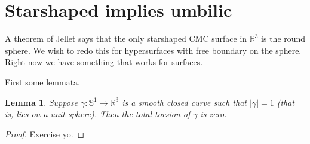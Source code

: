 \documentclass[10pt]{amsart}
\newcommand{\R}{\ensuremath{\mathbb{R}}}
\renewcommand{\S}{\ensuremath{\mathbb{S}}}
\newtheorem{lem}[thm]{Lemma}
\theoremstyle{remark}
\begin{document}
\section{Starshaped implies umbilic}%

A theorem of Jellet says that the only starshaped CMC surface in $\R^3$ is the round sphere.
We wish to redo this for hypersurfaces with free boundary on the sphere.
Right now we have something that works for surfaces.

First some lemmata.

\begin{lem}
Suppose $\gamma:\S^1\rightarrow\R^3$ is a smooth closed curve such that $|\gamma| = 1$ (that is, lies on a unit sphere).
Then the total torsion of $\gamma$ is zero.
\end{lem}
\begin{proof}
Exercise yo.
\end{proof}
\end{document}
